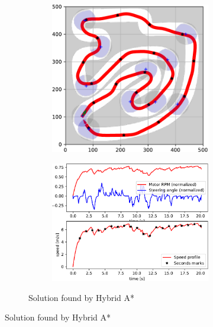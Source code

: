 \begin{figure}[!tbp]%
	\centering
		
	\begin{subfigure}[t]{\textwidth}
		\begin{subfigure}[t]{0.45\textwidth}
			\includegraphics[width=\textwidth]{../img/experiments/zurich-hybrid_astar-trajectory}
		\end{subfigure}
		\hfill
		\begin{subfigure}[t]{0.45\textwidth}
			\includegraphics[width=\textwidth]{../img/experiments/zurich-hybrid_astar-actuators}
		\end{subfigure}
		\caption{Solution found by Hybrid A*}
		\label{fig:zurich-hybrid_astar}
	\end{subfigure}


\end{figure}
